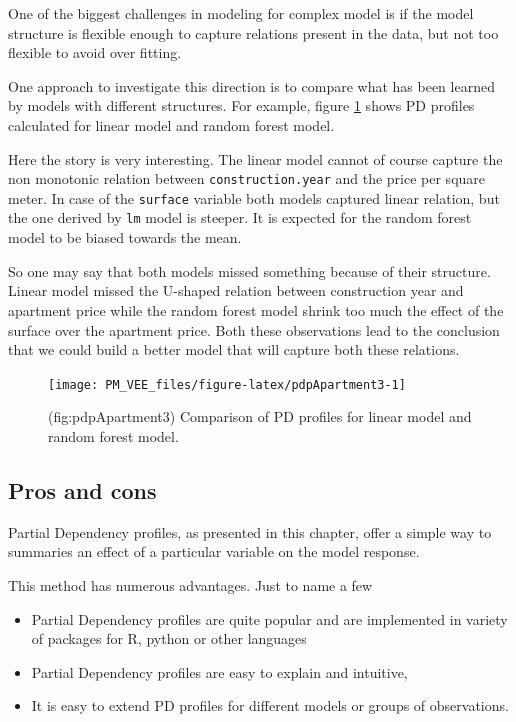 \documentclass[12pt,]{krantz}
\providecommand{\tightlist}{%
  \setlength{\itemsep}{0pt}\setlength{\parskip}{0pt}}
\begin{document}
One of the biggest challenges in modeling for complex model is if the model structure is flexible enough to capture relations present in the data, but not too flexible to avoid over fitting.

One approach to investigate this direction is to compare what has been learned by models with different structures. For example, figure \ref{fig:pdpApartment3} shows PD profiles calculated for linear model and random forest model.

Here the story is very interesting. The linear model cannot of course capture the non monotonic relation between \texttt{construction.year} and the price per square meter. In case of the \texttt{surface} variable both models captured linear relation, but the one derived by \texttt{lm} model is steeper. It is expected for the random forest model to be biased towards the mean.

So one may say that both models missed something because of their structure. Linear model missed the U-shaped relation between construction year and apartment price while the random forest model shrink too much the effect of the surface over the apartment price.
Both these observations lead to the conclusion that we could build a better model that will capture both these relations.

\begin{figure}

{\centering \texttt{[image: PM\_VEE\_files/figure-latex/pdpApartment3-1]} 

}

\caption{(fig:pdpApartment3) Comparison of PD profiles for linear model and random forest model.}\label{fig:pdpApartment3}
\end{figure}

\hypertarget{PDPProsCons}{%
\subsection{Pros and cons}\label{PDPProsCons}}

Partial Dependency profiles, as presented in this chapter, offer a simple way to summaries an effect of a particular variable on the model response.

This method has numerous advantages. Just to name a few

\begin{itemize}
\tightlist
\item
  Partial Dependency profiles are quite popular and are implemented in variety of packages for R, python or other languages
\item
  Partial Dependency profiles are easy to explain and intuitive,
\item
  It is easy to extend PD profiles for different models or groups of observations.
\end{itemize}
\end{document}
